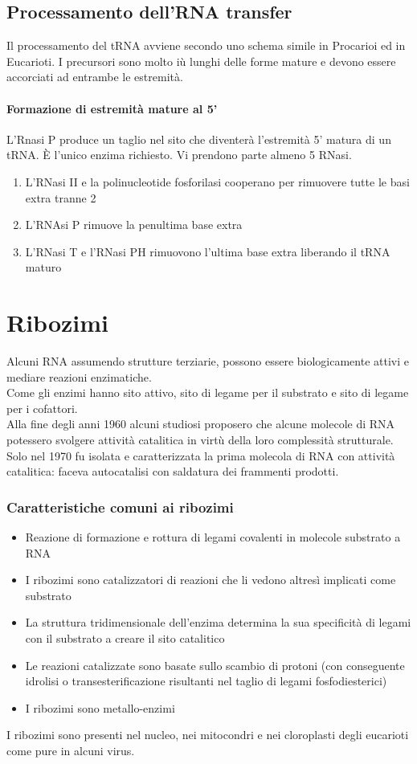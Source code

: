 \documentclass{article}
\begin{document}
\subsection{Processamento dell'RNA transfer}
Il processamento del tRNA avviene secondo uno schema simile in Procarioi ed in Eucarioti. I precursori sono molto iù lunghi delle forme mature e devono essere accorciati ad entrambe le estremità.\\
\paragraph{Formazione di estremità mature al 5'} L'Rnasi P produce un taglio nel sito che diventerà l'estremità 5' matura di un tRNA. È l'unico enzima richiesto.
Vi prendono parte almeno 5 RNasi.
\begin{enumerate}[label=(\alph*)]
    \item L'RNasi II e la polinucleotide fosforilasi cooperano per rimuovere tutte le basi extra tranne 2
    \item L'RNAsi P rimuove la penultima base extra
    \item L'RNasi T e l'RNasi PH rimuovono l'ultima base extra liberando il tRNA maturo
\end{enumerate}
\section{Ribozimi}
Alcuni RNA assumendo strutture terziarie, possono essere biologicamente attivi e mediare reazioni enzimatiche.\\
Come gli enzimi hanno sito attivo, sito di legame per il substrato e sito di legame per i cofattori.\\
Alla fine degli anni 1960 alcuni studiosi proposero che alcune molecole di RNA potessero
svolgere attività catalitica in virtù della loro complessità strutturale. Solo nel 1970 fu isolata e
caratterizzata la prima molecola di RNA con attività catalitica: faceva autocatalisi con saldatura dei frammenti prodotti.
\subsubsection{Caratteristiche comuni ai ribozimi}
\begin{itemize}
    \item Reazione di formazione e rottura di legami covalenti in molecole substrato a RNA
    \item I ribozimi sono catalizzatori di reazioni che li vedono altresì implicati come substrato
    \item La struttura tridimensionale dell'enzima determina la sua specificità di legami con il substrato a creare il sito catalitico
    \item Le reazioni catalizzate sono basate sullo scambio di protoni (con conseguente idrolisi o transesterificazione risultanti nel taglio di legami fosfodiesterici)
    \item I ribozimi sono metallo-enzimi
\end{itemize}
I ribozimi sono presenti nel nucleo, nei mitocondri e nei cloroplasti degli eucarioti come pure in alcuni virus.
\end{document}
